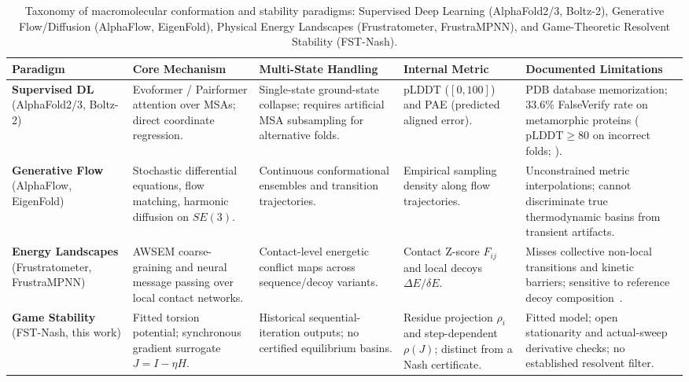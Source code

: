 \documentclass[12pt,a4paper]{article}
\theoremstyle{remark}
\begin{document}
\begin{table}[htbp]
\centering
\caption{Taxonomy of macromolecular conformation and stability paradigms: Supervised Deep Learning (AlphaFold2/3, Boltz-2), Generative Flow/Diffusion (AlphaFlow, EigenFold), Physical Energy Landscapes (Frustratometer, FrustraMPNN), and Game-Theoretic Resolvent Stability (FST-Nash).}
\label{tab:conformational-paradigms}
\footnotesize
\begin{tabularx}{\textwidth}{@{}L{0.18\textwidth} L{0.21\textwidth} L{0.19\textwidth} L{0.17\textwidth} Y@{}}
\toprule
\textbf{Paradigm} & \textbf{Core Mechanism} & \textbf{Multi-State Handling} & \textbf{Internal Metric} & \textbf{Documented Limitations} \\
\midrule
\textbf{Supervised DL} \newline (AlphaFold2/3, Boltz-2) & Evoformer / Pairformer attention over MSAs; direct coordinate regression. & Single-state ground-state collapse; requires artificial MSA subsampling for alternative folds. & pLDDT ($[0,100]$) and PAE (predicted aligned error). & PDB database memorization; 33.6\% FalseVerify rate on metamorphic proteins ($\text{pLDDT}\ge 80$ on incorrect folds; \citealp{NatureComms2024,Thacker2026,Ye2026}). \\
\addlinespace
\textbf{Generative Flow} \newline (AlphaFlow, EigenFold) & Stochastic differential equations, flow matching, harmonic diffusion on $SE(3)$. & Continuous conformational ensembles and transition trajectories. & Empirical sampling density along flow trajectories. & Unconstrained metric interpolations; cannot discriminate true thermodynamic basins from transient artifacts. \\
\addlinespace
\textbf{Energy Landscapes} \newline (Frustratometer, FrustraMPNN) & AWSEM coarse-graining and neural message passing over local contact networks. & Contact-level energetic conflict maps across sequence/decoy variants. & Contact Z-score $F_{ij}$ and local decoys $\Delta E / \delta E$. & Misses collective non-local transitions and kinetic barriers; sensitive to reference decoy composition~\citep{Beining2026,Leusch2026}. \\
\addlinespace
\textbf{Game Stability} \newline (FST-Nash, this work) & Fitted torsion potential; synchronous gradient surrogate $J=I-\eta H$. & Historical sequential-iteration outputs; no certified equilibrium basins. & Residue projection $\rho_i$ and step-dependent $\rho(J)$; distinct from a Nash certificate. & Fitted model; open stationarity and actual-sweep derivative checks; no established resolvent filter. \\
\bottomrule
\end{tabularx}
\end{table}
\end{document}
